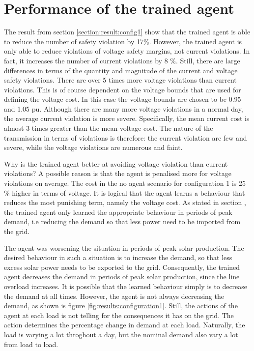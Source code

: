 \documentclass[class=book, crop=false]{standalone}
\begin{document}
\section{Performance of the trained agent}
The result from section \ref{section:result:config1} show that the trained agent is able to reduce the number of safety violation by 17\%. However, the trained agent is only able to reduce violations of voltage safety margins, not current violations. In fact, it increases the number of current violations by 8 \%. Still, there are large differences in terms of the quantity and magnitude of the current and voltage safety violations. There are over 5 times more voltage violations than current violations. This is of course dependent on the voltage bounds that are used for defining the voltage cost. In this case the voltage bounds are chosen to be 0.95 and 1.05 pu. Although there are many more voltage violations in a normal day, the average current violation is more severe. Specifically, the mean current cost is almost 3 times greater than the mean voltage cost. The nature of the transmission in terms of violations is therefore: the current violation are few and severe, while the voltage violations are numerous and faint.

Why is the trained agent better at avoiding voltage violation than current violations? A possible reason is that the agent is penalised more for voltage violations on average. The cost in the no agent scenario for configuration 1 is 25 \% higher in terms of voltage. It is logical that the agent learns a behaviour that reduces the most punishing term, namely the voltage cost. As stated in section \label{section:config1:current_violations}, the trained agent only learned the appropriate behaviour in periods of peak demand, i.e reducing the demand so that less power need to be imported from the grid.

The agent was worsening the situation in periods of peak solar production. The desired behaviour in such a situation is to increase the demand, so that less excess solar power needs to be exported to the grid. Consequently, the trained agent decreases the demand in periods of peak solar production, since the line overload increases. It is possible that the learned behaviour simply is to decrease the demand at all times. However, the agent is not always decreasing the demand, as shown is figure \ref{fig:results:configuration1}. Still, the actions of the agent at each load is not telling for the consequences it has on the grid. The action determines the percentage change in demand at each load. Naturally, the load is varying a lot throghout a day, but the nominal demand also vary a lot from load to load.
\end{document}
